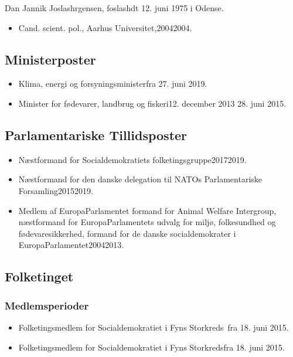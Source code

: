 \documentclass[11pt, a4paper]{awesome-cv}
\begin{document}
\makecvheader[R]
\makelettertitle
\begin{cvletter}
Dan Jannik Joslashrgensen, foslashdt 12. juni 1975 i Odense.

\begin{itemize}
\item Cand. scient. pol., Aarhus Universitet,20042004.
\end{itemize}
\subsection*{Ministerposter}
\begin{itemize}
\item Klima, energi og forsyningsministerfra 27. juni 2019.
\item Minister for fødevarer, landbrug og fiskeri12. december 2013  28. juni 2015.
\end{itemize}
\subsection*{Parlamentariske Tillidsposter}
\begin{itemize}
\item Næstformand for Socialdemokratiets folketingsgruppe20172019.
\item Næstformand for den danske delegation til NATOs Parlamentariske Forsamling20152019.
\item Medlem af EuropaParlamentet formand for Animal Welfare Intergroup, næstformand for EuropaParlamentets udvalg for miljø, folkesundhed og fødevaresikkerhed, formand for de danske socialdemokrater i EuropaParlamentet20042013.
\end{itemize}
\subsection*{Folketinget}
\subsubsection*{Medlemsperioder}
\begin{itemize}
\item Folketingsmedlem for Socialdemokratiet i Fyns Storkreds fra 18. juni 2015.
\item Folketingsmedlem for Socialdemokratiet i Fyns Storkredsfra 18. juni 2015.
\end{itemize}

\end{cvletter}
\end{document}
